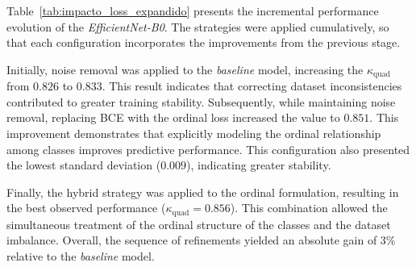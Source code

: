 Table~\ref{tab:impacto_loss_expandido} presents the incremental performance evolution of the \textit{EfficientNet-B0}. The strategies were applied cumulatively, so that each configuration incorporates the improvements from the previous stage.

Initially, noise removal was applied to the \textit{baseline} model, increasing the $\kappa_{\text{quad}}$ from $0.826$ to $0.833$. This result indicates that correcting dataset inconsistencies contributed to greater training stability. Subsequently, while maintaining noise removal, replacing BCE with the ordinal loss increased the value to $0.851$. This improvement demonstrates that explicitly modeling the ordinal relationship among classes improves predictive performance. This configuration also presented the lowest standard deviation ($0.009$), indicating greater stability.

Finally, the hybrid strategy was applied to the ordinal formulation, resulting in the best observed performance ($\kappa_{\text{quad}} = 0.856$). This combination allowed the simultaneous treatment of the ordinal structure of the classes and the dataset imbalance. Overall, the sequence of refinements yielded an absolute gain of 3\% relative to the \textit{baseline} model.

\begin{table}[!htb]
	\centering
	\caption{Impact of the loss function formulation on EfficientNet-B0 performance}
	\label{tab:impacto_loss_expandido}
\end{table}

